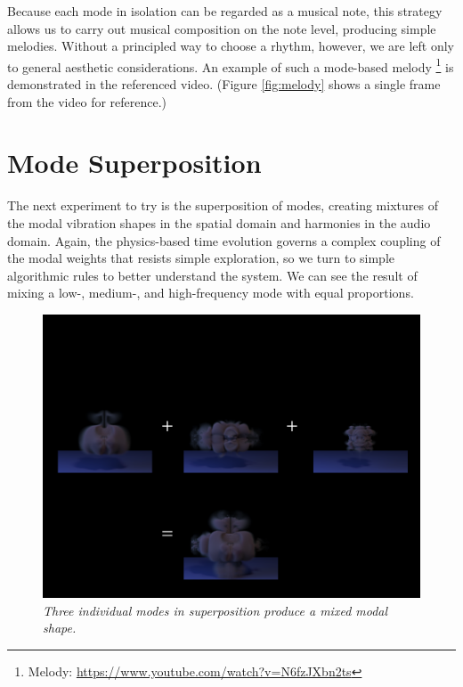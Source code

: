 Because each mode in isolation can be regarded as a musical note, this strategy allows us to carry out musical composition on the note level, producing simple melodies. Without a principled way to choose a rhythm,
however, we are left only to general aesthetic considerations. An example of such a mode-based melody \footnote{Melody: \url{https://www.youtube.com/watch?v=N6fzJXbn2ts}} is demonstrated in the referenced video. (Figure \ref{fig:melody} shows a single 
frame from the video for reference.)

\section{Mode Superposition}
The next experiment to try is the superposition of modes, creating mixtures of the modal vibration shapes in the spatial domain and harmonies in the audio domain. Again, the physics-based time evolution governs a complex coupling of the modal weights that resists simple exploration, so we turn to simple algorithmic rules to better understand the system. We can see the result of mixing a low-, medium-, and high-frequency mode with equal proportions.

\begin{figure}[H]
	\centering
	\includegraphics[width=\textwidth]{chap6/figures/superposition.png}
	\caption{\em Three individual modes in superposition produce a mixed modal shape.}
\label{fig:superposition}
\end{figure}

